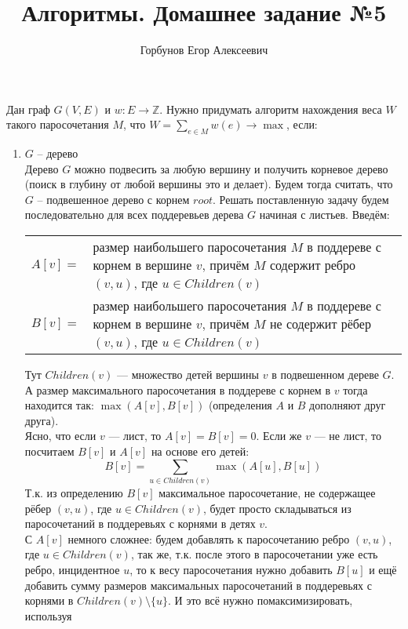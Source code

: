 
\title{Алгоритмы. Домашнее задание №5}
\author{Горбунов Егор Алексеевич}


\maketitle

Дан граф $G(V,E)$ и $w:E \rightarrow \mathbb{Z}$. Нужно придумать алгоритм нахождения веса $W$ такого паросочетания $M$, что
$W = \sum_{e\in M}{w(e)} \rightarrow \max$, если:
\begin{enumerate}[label=(\alph*)]
\item $G$ -- дерево\\
Дерево $G$ можно подвесить за любую вершину и получить корневое дерево (поиск в глубину от любой вершины это и делает).
Будем тогда считать, что $G$ -- подвешенное дерево с корнем $root$. Решать поставленную задачу будем последовательно 
для всех поддеревьев дерева $G$ начиная с листьев. Введём: \\
\begin{tabular}{lp{15cm}}
  $A[v]=$ & размер наибольшего паросочетания $M$ в поддереве с корнем в вершине $v$, причём $M$ содержит ребро $(v,u)$, 
  где $u\in Children(v)$\\
  $B[v]=$ & размер наибольшего паросочетания $M$ в поддереве с корнем в вершине $v$, причём $M$ не содержит рёбер $(v,u)$, 
  где $u\in Children(v)$\\
\end{tabular}
Тут $Children(v)$ --- множество детей вершины $v$ в подвешенном дереве $G$. А размер максимального паросочетания в поддереве
с корнем в $v$ тогда находится так: $\max(A[v],B[v])$ (определения $A$ и $B$ дополняют друг друга). \\
Ясно, что если $v$ --- лист, то $A[v]=B[v]=0$. Если же $v$ --- не лист, то посчитаем $B[v]$ и $A[v]$ на основе его детей:
\[ 
	B[v] =  \sum_{u\in Children(v)}{\max(A[u],B[u])} 
\]
Т.к. из определению $B[v]$ максимальное паросочетание, не содержащее рёбер $(v,u)$, где $u\in Children(v)$, будет просто
складываться из паросочетаний в поддеревьях с корнями в детях $v$.\\
С $A[v]$ немного сложнее: будем добавлять к паросочетанию ребро $(v,u)$, где $u\in Children(v)$, так же, т.к. после этого
в паросочетании уже есть ребро, инцидентное $u$, то к весу паросочетания нужно добавить $B[u]$ и ещё добавить сумму размеров
максимальных паросочетаний в поддеревьях с корнями в $Children(v)\setminus \lbrace u \rbrace$. И это всё нужно помаксимизировать, используя

\end{enumerate}

